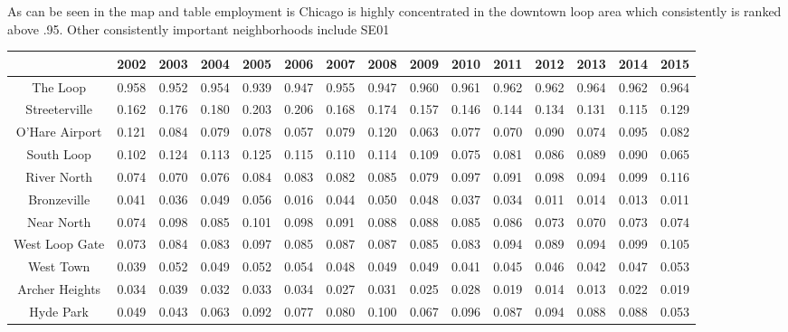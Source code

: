 \documentclass{article}
\theoremstyle{definition}
\theoremstyle{remark}
\begin{document}
As can be seen in the map and table employment is Chicago is highly concentrated in the downtown loop area which consistently is ranked above .95.  Other consistently important neighborhoods include 
SE01 \\
\begin{adjustbox}{center}
\begin{tabular}{||c | c c c c c c c c c c c c c c ||} 
 \hline
 & 2002 & 2003 & 2004 & 2005 & 2006 & 2007 & 2008 & 2009 & 2010 & 2011 & 2012 & 2013 & 2014 & 2015\\[0.5ex] 
 \hline\hline
The Loop & 0.958 & 0.952 & 0.954 & 0.939 & 0.947 & 0.955 & 0.947 & 0.960 & 0.961 & 0.962 & 0.962 & 0.964 & 0.962 & 0.964 \\
Streeterville & 0.162 & 0.176 & 0.180 & 0.203 & 0.206 & 0.168 & 0.174 & 0.157 & 0.146 & 0.144 & 0.134 & 0.131 & 0.115 & 0.129 \\
O'Hare Airport & 0.121 & 0.084 & 0.079 & 0.078 & 0.057 & 0.079 & 0.120 & 0.063 & 0.077 & 0.070 & 0.090 & 0.074 & 0.095 & 0.082 \\
South Loop & 0.102 & 0.124 & 0.113 & 0.125 & 0.115 & 0.110 & 0.114 & 0.109 & 0.075 & 0.081 & 0.086 & 0.089 & 0.090 & 0.065 \\
River North & 0.074 & 0.070 & 0.076 & 0.084 & 0.083 & 0.082 & 0.085 & 0.079 & 0.097 & 0.091 & 0.098 & 0.094 & 0.099 & 0.116 \\
Bronzeville & 0.041 & 0.036 & 0.049 & 0.056 & 0.016 & 0.044 & 0.050 & 0.048 & 0.037 & 0.034 & 0.011 & 0.014 & 0.013 & 0.011 \\
Near North & 0.074 & 0.098 & 0.085 & 0.101 & 0.098 & 0.091 & 0.088 & 0.088 & 0.085 & 0.086 & 0.073 & 0.070 & 0.073 & 0.074 \\
West Loop Gate & 0.073 & 0.084 & 0.083 & 0.097 & 0.085 & 0.087 & 0.087 & 0.085 & 0.083 & 0.094 & 0.089 & 0.094 & 0.099 & 0.105 \\
West Town & 0.039 & 0.052 & 0.049 & 0.052 & 0.054 & 0.048 & 0.049 & 0.049 & 0.041 & 0.045 & 0.046 & 0.042 & 0.047 & 0.053 \\
Archer Heights & 0.034 & 0.039 & 0.032 & 0.033 & 0.034 & 0.027 & 0.031 & 0.025 & 0.028 & 0.019 & 0.014 & 0.013 & 0.022 & 0.019 \\
Hyde Park & 0.049 & 0.043 & 0.063 & 0.092 & 0.077 & 0.080 & 0.100 & 0.067 & 0.096 & 0.087 & 0.094 & 0.088 & 0.088 & 0.053  \\
\hline
 \end{tabular}
\end{adjustbox}
\end{document}
